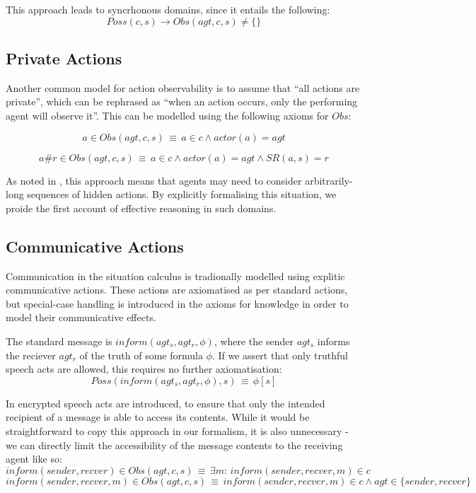 This approach leads to syncrhonous domains, since it entails the following:\[
Poss(c,s)\rightarrow Obs(agt,c,s)\neq\{\}\]



\subsection{Private Actions}

Another common model for action observability is to assume that {}``all
actions are private'', which can be rephrased as {}``when an action
occurs, only the performing agent will observe it''. This can be
modelled using the following axioms for $Obs$:

\[
a\in Obs(agt,c,s)\,\equiv\, a\in c\wedge actor(a)=agt\]


\[
a\#r\in Obs(agt,c,s)\,\equiv\, a\in c\wedge actor(a)=agt\wedge SR(a,s)=r\]


As noted in \citep{Lesperance99sitcalc_approach}, this approach means
that agents may need to consider arbitrarily-long sequences of hidden
actions. By explicitly formalising this situation, we proide the first
account of effective reasoning in such domains.


\subsection{Communicative Actions}

Communication in the situation calculus is tradionally modelled using
explitic communicative actions. These actions are axiomatised as per
standard actions, but special-case handling is introduced in the axioms
for knowledge in order to model their communicative effects.

The standard message is $inform(agt_{s},agt_{r},\phi)$, where the
sender $agt_{s}$ informs the reciever $agt_{r}$ of the truth of
some formula $\phi$. If we assert that only truthful speech acts
are allowed, this requires no further axiomatisation:\[
Poss(inform(agt_{s},agt_{r},\phi),s)\,\equiv\,\phi[s]\]


In \citep{shapiro01casl_feat_inter} encrypted speech acts are introduced,
to ensure that only the intended recipient of a message is able to
access its contents. While it would be straightforward to copy this
approach in our formalism, it is also unnecessary - we can directly
limit the accessibility of the message contents to the receiving agent
like so:\[
inform(sender,recver)\in Obs(agt,c,s)\,\equiv\,\exists m:\, inform(sender,recver,m)\in c\]
 \[
inform(sender,recver,m)\in Obs(agt,c,s)\,\equiv\, inform(sender,recver,m)\in c\wedge agt\in\{sender,recver\}\]



